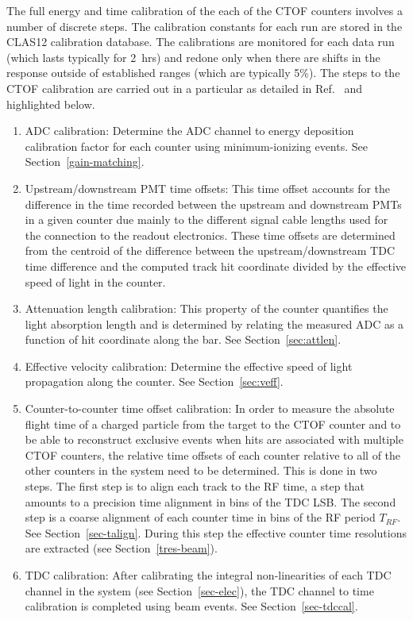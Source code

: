 \documentclass{elsart}
\begin{document}
The full energy and time calibration of the each of the CTOF counters involves a number of discrete
steps. The calibration constants for each run are stored in the CLAS12 calibration database. The
calibrations are monitored for each data run (which lasts typically for 2~hrs) and redone only when
there are shifts in the response outside of established ranges (which are typically 5\%). The steps
to the CTOF calibration are carried out in a particular as detailed in Ref.~\cite{ctof-calib} and
highlighted below.

\begin{enumerate}
\item ADC calibration: Determine the ADC channel to energy deposition calibration factor for each
counter using minimum-ionizing events. See Section~\ref{gain-matching}.

\item Upstream/downstream PMT time offsets: This time offset accounts for the difference in the time
recorded between the upstream and downstream PMTs in a given counter due mainly to the different
signal cable lengths used for the connection to the readout electronics. These time offsets are determined
from the centroid of the difference between the upstream/downstream TDC time difference and the
computed track hit coordinate divided by the effective speed of light in the counter. 

\item Attenuation length calibration: This property of the counter quantifies the light absorption length
and is determined by relating the measured ADC as a function of hit coordinate along the bar. See
Section~\ref{sec:attlen}.

\item Effective velocity calibration: Determine the effective speed of light propagation along the
counter. See Section~\ref{sec:veff}.

\item Counter-to-counter time offset calibration: In order to measure the absolute flight time of a
charged particle from the target to the CTOF counter and to be able to reconstruct exclusive events
when hits are associated with multiple CTOF counters, the relative time offsets of each counter relative
to all of the other counters in the system need to be determined. This is done in two steps. The first
step is to align each track to the RF time, a step that amounts to a precision time alignment in bins of
the TDC LSB. The second step is a coarse alignment of each counter time in bins of the RF period
$T_{RF}$. See Section~\ref{sec-talign}. During this step the effective counter time resolutions are
extracted (see Section~\ref{tres-beam}).

\item TDC calibration: After calibrating the integral non-linearities of each TDC channel in the system
(see Section~\ref{sec-elec}), the TDC channel to time calibration is completed using beam events. See
Section~\ref{sec-tdccal}.

\end{enumerate}
\end{document}
